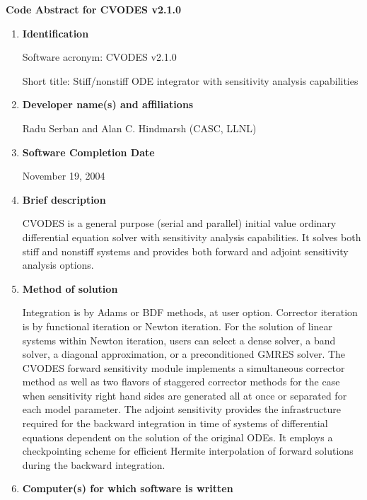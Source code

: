 \documentclass[12pt]{letter}
\begin{document}
\pagestyle{empty}

\begin{letter}

\vspace{0.2in}
\centerline{\bf Code Abstract for CVODES v2.1.0}

\begin{enumerate}

\item {\bf Identification}

Software acronym: CVODES v2.1.0

Short title: Stiff/nonstiff ODE integrator with sensitivity analysis capabilities

\item {\bf Developer name(s) and affiliations}

Radu Serban and Alan C. Hindmarsh (CASC, LLNL)

\item {\bf Software Completion Date}

November 19, 2004

\item {\bf Brief description}

CVODES is a general purpose (serial and parallel) initial value ordinary differential 
equation solver with sensitivity analysis capabilities. It solves both stiff and 
nonstiff systems and provides both forward and adjoint sensitivity analysis options.

\item {\bf Method of solution}

Integration is by Adams or BDF methods, at user option. Corrector iteration is by 
functional iteration or Newton iteration. For the solution of linear systems within 
Newton iteration, users can select a dense solver, a band solver, a diagonal 
approximation, or a preconditioned GMRES solver. The CVODES forward 
sensitivity module implements a simultaneous corrector method as well as two 
flavors of staggered corrector methods for the case when sensitivity right hand 
sides are generated all at once or separated for each model parameter. The adjoint 
sensitivity provides the infrastructure required for the backward integration in time 
of systems of differential equations dependent on the solution of the original ODEs. 
It employs a checkpointing scheme for efficient Hermite interpolation of forward 
solutions during the backward integration.

\item {\bf Computer(s) for which software is written}


\end{enumerate}
\end{letter}
\end{document}
